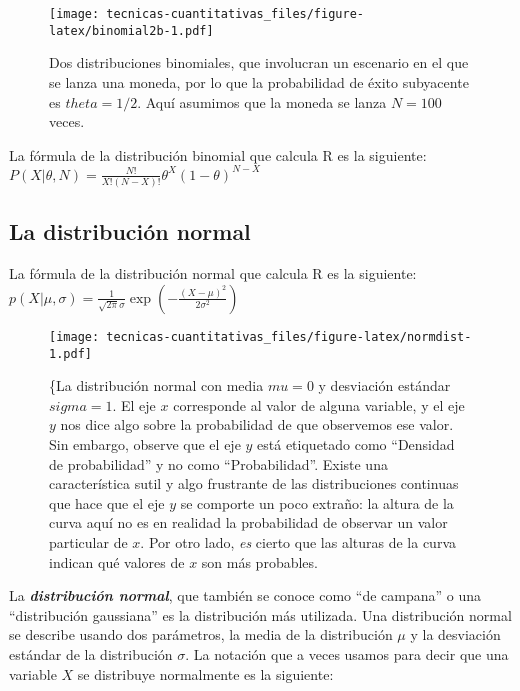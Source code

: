 \documentclass[
]{book}
\begin{document}
\begin{figure}
\centering
\texttt{[image: tecnicas-cuantitativas\_files/figure-latex/binomial2b-1.pdf]}
\caption{\label{fig:binomial2b}Dos distribuciones binomiales, que involucran un escenario en el que se lanza una moneda, por lo que la probabilidad de éxito subyacente es \(theta=1/2\). Aquí asumimos que la moneda se lanza \(N=100\) veces.}
\end{figure}

La fórmula de la distribución binomial que calcula R es la siguiente:
\(P(X | \theta, N) = \displaystyle\frac{N!}{X! (N-X)!} \theta^X (1-\theta)^{N-X}\)

\hypertarget{la-distribuciuxf3n-normal}{%
\subsection{La distribución normal}\label{la-distribuciuxf3n-normal}}

La fórmula de la distribución normal que calcula R es la siguiente:
\(p(X | \mu, \sigma) = \displaystyle\frac{1}{\sqrt{2\pi}\sigma} \exp \left( -\frac{(X - \mu)^2}{2\sigma^2} \right)\)

\begin{figure}
\centering
\texttt{[image: tecnicas-cuantitativas\_files/figure-latex/normdist-1.pdf]}
\caption{\label{fig:normdist}\{La distribución normal con media \(mu=0\) y desviación estándar \(sigma = 1\). El eje \(x\) corresponde al valor de alguna variable, y el eje \(y\) nos dice algo sobre la probabilidad de que observemos ese valor. Sin embargo, observe que el eje \(y\) está etiquetado como ``Densidad de probabilidad'' y no como ``Probabilidad''. Existe una característica sutil y algo frustrante de las distribuciones continuas que hace que el eje \(y\) se comporte un poco extraño: la altura de la curva aquí no es en realidad la probabilidad de observar un valor particular de \(x\). Por otro lado, \emph{es} cierto que las alturas de la curva indican qué valores de \(x\) son más probables.}
\end{figure}

La \textbf{\emph{distribución normal}}, que también se conoce como ``de campana'' o una ``distribución gaussiana'' es la distribución más utilizada. Una distribución normal se describe usando dos parámetros, la media de la distribución \(\mu\) y la desviación estándar de la distribución \(\sigma\). La notación que a veces usamos para decir que una variable \(X\) se distribuye normalmente es la siguiente:
\end{document}
